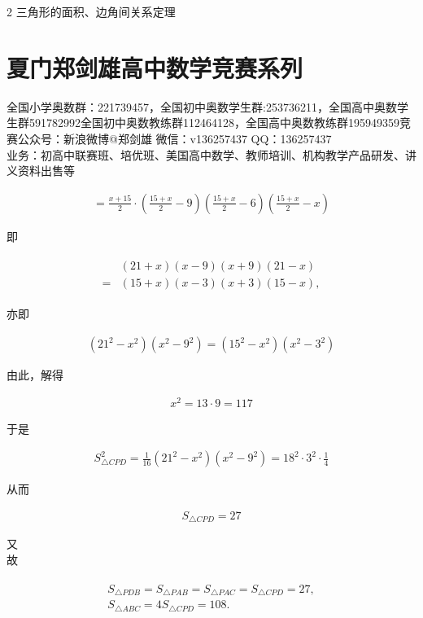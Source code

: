 \documentclass[10pt]{article}
\begin{document}
2 三角形的面积、边角间关系定理

\section*{夏门郑剑雄高中数学竞赛系列}
全国小学奥数群：221739457，全国初中奥数学生群:253736211，全国高中奥数学生群591782992全国初中奥数教练群112464128，全国高中奥数教练群195949359竞赛公众号：新浪微博@郑剑雄 微信：v136257437 QQ：136257437\\
业务：初高中联赛班、培优班、美国高中数学、教师培训、机构教学产品研发、讲义资料出售等

\begin{align*}
=\frac{x+15}{2} \cdot\left(\frac{15+x}{2}-9\right)\left(\frac{15+x}{2}-6\right)\left(\frac{15+x}{2}-x\right)
\end{align*}

即

\begin{align*}
\begin{aligned}
& (21+x)(x-9)(x+9)(21-x) \\
= & (15+x)(x-3)(x+3)(15-x),
\end{aligned}
\end{align*}

亦即

\begin{align*}
\left(21^{2}-x^{2}\right)\left(x^{2}-9^{2}\right)=\left(15^{2}-x^{2}\right)\left(x^{2}-3^{2}\right)
\end{align*}

由此，解得

\begin{align*}
x^{2}=13 \cdot 9=117
\end{align*}

于是

\begin{align*}
S_{\triangle C P D}^{2}=\frac{1}{16}\left(21^{2}-x^{2}\right)\left(x^{2}-9^{2}\right)=18^{2} \cdot 3^{2} \cdot \frac{1}{4}
\end{align*}

从而

\begin{align*}
S_{\triangle C P D}=27
\end{align*}

又\\
故

\begin{align*}
\begin{gathered}
S_{\triangle P D B}=S_{\triangle P A B}=S_{\triangle P A C}=S_{\triangle C P D}=27, \\
S_{\triangle A B C}=4 S_{\triangle C P D}=108 .
\end{gathered}
\end{align*}
\end{document}
